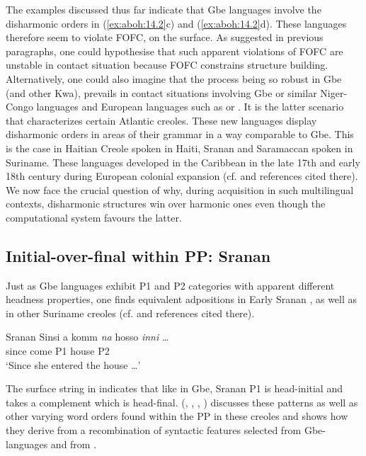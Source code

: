 \documentclass[output=paper]{langsci/langscibook}
\begin{document}
The examples discussed thus far indicate that Gbe languages involve the
disharmonic orders in (\ref{ex:aboh:14.2}c) and (\ref{ex:aboh:14.2}d). These languages therefore seem to violate
FOFC, on the surface. As suggested in previous paragraphs, one could
hypothesise that such apparent violations of \gls{FOFC} are unstable in contact
situation because \gls{FOFC} constrains structure building.  Alternatively, one could
also imagine that the process being so robust in Gbe (and other Kwa), prevails
in contact situations involving Gbe or similar Niger-Congo languages and
European languages such as  or . It is the latter scenario that
characterizes certain Atlantic creoles. These new languages display disharmonic
orders in areas of their grammar in a way comparable to Gbe. This is the case
in Haitian Creole spoken in Haiti, Sranan and Saramaccan spoken in Suriname.
These languages developed in the Caribbean in the late 17th and early 18th
century during European colonial expansion (cf. \citealt{Aboh2015} and
references cited there).
%
We now face the crucial question of why, during acquisition in such
multilingual contexts, disharmonic structures win over harmonic ones even
though the computational system favours the latter.

\subsection{Initial-over-final within PP: Sranan}

Just as Gbe languages exhibit P1 and P2 categories with apparent different
headness properties, one finds equivalent adpositions in Early Sranan
, as well as in other Suriname creoles (cf. \citealt{Bruyn2003}
and references cited there).

\ea\label{ex:aboh:14.11b} Sranan \parencite[32]{Bruyn2003}
    \sn\gll Sinsi a komm \textit{na} hosso \textit{inni} \dots{} \\
            since \Tsg{} come P1 house P2 {} \\
    \glt    \enquote*{Since she entered the house \dots{}}
\z

The surface string in  indicates that like in Gbe, Sranan P1 is
head-initial and takes a complement which is head-final.
\citeauthor{Aboh2010c} (\citeyear{Aboh2010c}, \citeyear{Aboh2015},
\citeyear{Aboh2016b}, \citeyear{Aboh2017}) discusses these patterns as
well as other varying word orders found within the PP in these creoles and
shows how they derive from a recombination of syntactic features selected from
Gbe-languages and from .
\end{document}
